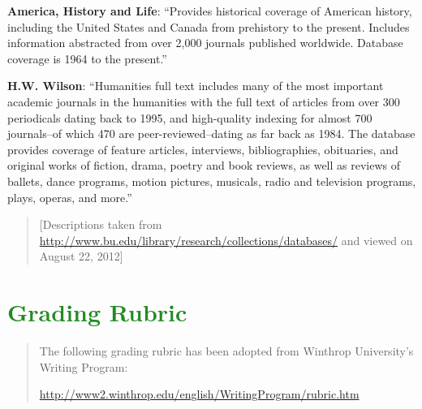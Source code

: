 \documentclass[12pt, hidelinks]{article} %
\begin{document}
\textbf{America, History and Life}: ``Provides historical coverage of American history, including the United States and Canada from prehistory to the present. Includes information abstracted from over 2,000 journals published worldwide. Database coverage is 1964 to the present.''

\textbf{H.W. Wilson}: ``Humanities full text includes many of the most important academic journals in the humanities with the full text of articles from over 300 periodicals dating back to 1995, and high-quality indexing for almost 700 journals--of which 470 are peer-reviewed--dating as far back as 1984. The database provides coverage of feature articles, interviews, bibliographies, obituaries, and original works of fiction, drama, poetry and book reviews, as well as reviews of ballets, dance programs, motion pictures, musicals, radio and television programs, plays, operas, and more.''


\begin{quote}
[Descriptions taken from \url{http://www.bu.edu/library/research/collections/databases/} and viewed on August 22, 2012]
\end{quote}


\section{\textcolor{ForestGreen}{Grading Rubric}}

\begin{quote}
The following grading rubric has been adopted from Winthrop University's Writing Program:


\url{http://www2.winthrop.edu/english/WritingProgram/rubric.htm}

\end{quote}
\end{document}
